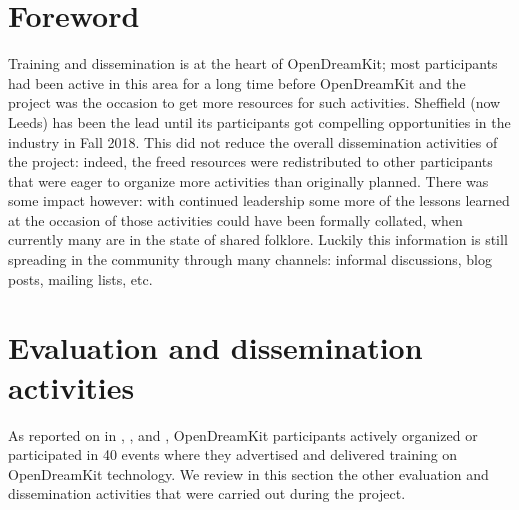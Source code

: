 \documentclass{deliverablereport}
\author{Mike Croucher, Hans Fanghor and Nicolas M. Thiéry}
\begin{document}
\maketitle
\enlargethispage{.5cm}
\githubissuedescription
\clearpage
\tableofcontents


\section*{Foreword}

Training and dissemination is at the heart of OpenDreamKit; most
participants had been active in this area for a long time before
OpenDreamKit and the project was the occasion to get more resources
for such activities. Sheffield (now Leeds) has been the lead until its
participants got compelling opportunities in the industry in Fall
2018. This did not reduce the overall dissemination activities of the
project: indeed, the freed resources were redistributed to other
participants that were eager to organize more activities than
originally planned. There was some impact however: with continued
leadership some more of the lessons learned at the occasion of those
activities could have been formally collated, when currently many are
in the state of shared folklore. Luckily this information is still
spreading in the community through many channels: informal
discussions, blog posts, mailing lists, etc.

\section{Evaluation and dissemination activities}

As reported on in ,
, and ,
OpenDreamKit participants actively organized or participated in 40
events where they advertised and delivered training on OpenDreamKit
technology. We review in this section the other evaluation and
dissemination activities that were carried out during the project.



\end{document}
